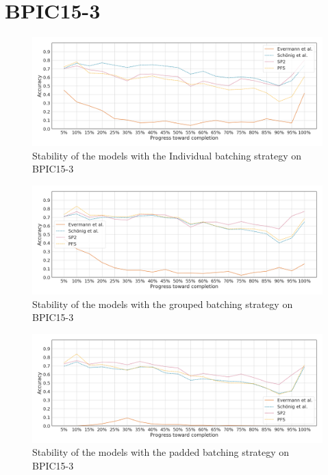 \section*{BPIC15-3}
\begin{figure}[!htb]
    \centering
    \includegraphics[width=\textwidth]{gfx/bpic2015_3/individual_stability.png}
    \caption{Stability of the models with the Individual batching strategy on BPIC15-3}
    \label{fig:bpic15-3-individual-stability}
\end{figure}
\begin{figure}[!htb]
    \centering
    \includegraphics[width=\textwidth]{gfx/bpic2015_3/grouped_stability.png}
    \caption{Stability of the models with the grouped batching strategy on BPIC15-3}
    \label{fig:bpic15-3-grouped-stability}
\end{figure}
\begin{figure}[!htb]
    \centering
    \includegraphics[width=\textwidth]{gfx/bpic2015_3/padded_stability.png}
    \caption{Stability of the models with the padded batching strategy on BPIC15-3}
    \label{fig:bpic15-3-padded-stability}
\end{figure}
